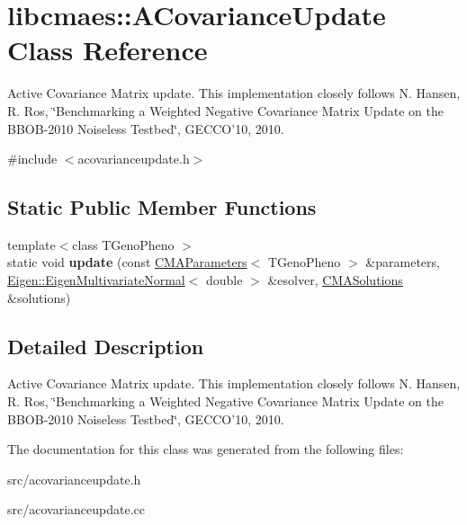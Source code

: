 \hypertarget{classlibcmaes_1_1ACovarianceUpdate}{\section{libcmaes\+:\+:A\+Covariance\+Update Class Reference}
\label{classlibcmaes_1_1ACovarianceUpdate}
}


Active Covariance Matrix update. This implementation closely follows N. Hansen, R. Ros, \char`\"{}\+Benchmarking a Weighted Negative Covariance Matrix 
                           Update on the B\+B\+O\+B-\/2010 Noiseless Testbed\char`\"{}, G\+E\+C\+C\+O'10, 2010.  




{\ttfamily \#include $<$acovarianceupdate.\+h$>$}

\subsection*{Static Public Member Functions}
\begin{DoxyCompactItemize}
\item 
\hypertarget{classlibcmaes_1_1ACovarianceUpdate_a87c39fb576507d536d98162209154727}{{\footnotesize template$<$class T\+Geno\+Pheno $>$ }\\static void {\bfseries update} (const \hyperlink{classlibcmaes_1_1CMAParameters}{C\+M\+A\+Parameters}$<$ T\+Geno\+Pheno $>$ \&parameters, \hyperlink{classEigen_1_1EigenMultivariateNormal}{Eigen\+::\+Eigen\+Multivariate\+Normal}$<$ double $>$ \&esolver, \hyperlink{classlibcmaes_1_1CMASolutions}{C\+M\+A\+Solutions} \&solutions)}\label{classlibcmaes_1_1ACovarianceUpdate_a87c39fb576507d536d98162209154727}

\end{DoxyCompactItemize}


\subsection{Detailed Description}
Active Covariance Matrix update. This implementation closely follows N. Hansen, R. Ros, \char`\"{}\+Benchmarking a Weighted Negative Covariance Matrix 
                           Update on the B\+B\+O\+B-\/2010 Noiseless Testbed\char`\"{}, G\+E\+C\+C\+O'10, 2010. 

The documentation for this class was generated from the following files\+:\begin{DoxyCompactItemize}
\item 
src/acovarianceupdate.\+h\item 
src/acovarianceupdate.\+cc\end{DoxyCompactItemize}
